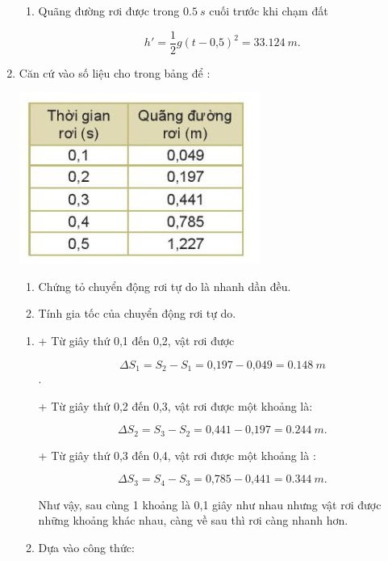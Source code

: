 \begin{enumerate}[label=\bfseries Câu \arabic*:]
{\begin{enumerate}[label=\alph*)]
			$$ v = gt = \SI{30,38}{m/s}.$$
			
			\item Quãng đường rơi được trong $\SI{0,5}{s}$ cuối trước khi chạm đất
			
			$$h' = \dfrac{1}{2} g(t - \text{0,5})^2 = \SI{33,124}{m}.$$
		\end{enumerate}
	}
		\item {}
	
	
	{
		Căn cứ vào số liệu cho trong bảng để :
		\begin{center}
			\includegraphics[scale=1]{../figs/VN10-2022-PH-TP013-1.jpg}
		\end{center}
		\begin{enumerate}[label=\alph*)]
			\item Chứng tỏ chuyển động rơi tự do là nhanh dần đều. 
			\item Tính gia tốc của chuyển động rơi tự do.
		\end{enumerate}
	}
	\hideall
	{	
		\begin{enumerate}[label=\alph*)]
			\item 
			+ Từ giây thứ 0,1 đến 0,2, vật rơi được
			
			 $$\Delta S_1 = S_2 -  S_1=\text{0,197} - \text{0,049} = \SI{0,148}{m}$$.
			
			+ Từ giây thứ 0,2 đến 0,3, vật rơi được một khoảng là: 
			
			$$\Delta S_2 = S_3 -  S_2= \text{0,441} - \text{0,197}= \SI{0,244}{m}.$$
			
			+ Từ giây thứ 0,3 đến 0,4, vật rơi được một khoảng là :
			 
			$$\Delta S_3= S_4 - S_3= \text{0,785} - \text{0,441}= \SI{0,344}{m}.$$
			
			Như vậy, sau cùng 1 khoảng là 0,1 giây như nhau nhưng vật rơi được những khoảng khác nhau, càng về sau thì rơi càng nhanh hơn. 
			
			\item Dựa vào công thức:
			

\end{enumerate}}
\end{enumerate}
